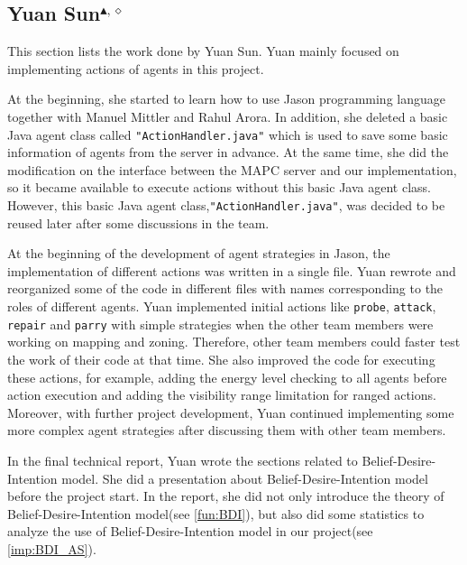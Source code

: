 \subsection[Yuan Sun]{Yuan Sun$^{\blacktriangle,\diamond}$}
This section lists the work done by Yuan Sun.
Yuan mainly focused on implementing actions of agents in this project.

At the beginning, she started to learn how to use Jason programming language together with Manuel Mittler and Rahul Arora. 
In addition, she deleted a basic Java agent class called \texttt{"ActionHandler.java"} which is used to save some basic information of agents from the server in advance.
At the same time, she did the modification on the interface between the MAPC server and our implementation, so it became available to execute actions without this basic Java agent class. 
However, this basic Java agent class,\texttt{"ActionHandler.java"}, was decided to be reused later after some discussions in the team.

At the beginning of the development of agent strategies in Jason, the implementation of different actions was written in a single file. 
Yuan rewrote and reorganized some of the code in different files with names corresponding to the roles of different agents. 
Yuan implemented initial actions like \texttt{probe}, \texttt{attack}, \texttt{repair} and \texttt{parry} with simple strategies when the other team members were working on mapping and zoning. 
Therefore, other team members could faster test the work of their code at that time. 
She also improved the code for executing these actions, for example, adding the energy level checking to all agents before action execution and adding the visibility range limitation for ranged actions. 
Moreover, with further project development, Yuan continued implementing some more complex agent strategies after discussing them with other team members. 

In the final technical report, Yuan wrote the sections related to Belief-Desire-Intention model. 
She did a presentation about Belief-Desire-Intention model before the project start. 
In the report, she did not only introduce the theory of Belief-Desire-Intention model(see \autoref{fun:BDI}), but also did some statistics to analyze the use of Belief-Desire-Intention model in our project(see \autoref{imp:BDI_AS}). 